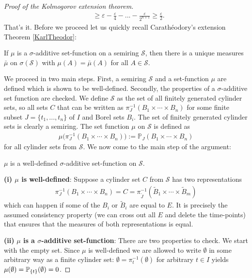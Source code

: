 \begin{proof}[Proof of the Kolmogorov extension theorem]
\begin{align*}
		&\geq \varepsilon-\frac{\varepsilon}{4}-...-\frac{\varepsilon}{2^{n+1}}
		\geq \frac{\varepsilon}{2}.
	\end{align*}
That's it. Before we proceed let us quickly recall Carath\'eodory's extension Theorem \ref{KarlTheodor}:	
	\begin{ltipp}
	If $\mu$ is a $\sigma$-additive set-function on a semiring $\mathcal S$, then there is a unique measures $\bar \mu$ on $\sigma(\mathcal S)$ with $\mu(A)=\bar \mu(A)$ for all $A\in \mathcal S$.
	\end{ltipp}
	We proceed in two main steps. First, a semiring $\mathcal S$ and a set-function $\mu$ are defined which is shown to be well-defined. Secondly, the properties of a $\sigma$-additive set function are checked. We define $\mathcal S$ as the set of all finitely generated cylinder sets, so all sets $C$ that can be written as $\pi^{-1}_J(B_1\times \cdots\times B_n)$ for some finite subset $J=\{t_1,...,t_n\}$ of $I$ and Borel sets $B_i$. The set of finitely generated cylinder sets is clearly a semiring. The set function $\mu$ on $\mathcal S$ is defined as 
	\begin{align}\label{eq_22}
		\mu\big(  \pi^{-1}_J(B_1\times \cdots\times B_n)  \big):=\mathbb{P}_{J}(B_1\times\cdots\times B_n)
	\end{align}
	for all cylinder sets from $\mathcal S$. We now come to the main step of the argument:
	\begin{lstep}
		$\mu$ is a well-defined $\sigma$-additive set-function on $\mathcal S$.
	\end{lstep}
	\textbf{(i) $\mu$ is well-defined}: Suppose a cylinder set $C$ from $\mathcal S$ has two representations 
	 \begin{align}\label{eq_27}
			\pi^{-1}_{J}(B_1\times \cdots \times B_n)=C=\pi^{-1}_{\tilde J}(\tilde B_1\times \cdots \times \tilde B_m)
	\end{align}
	which can happen if some of the $B_i$ or $\tilde B_i$ are equal to $E$. It is precisely the assumed consistency property (we can cross out all $E$ and delete the time-points) that ensures that the measures of both representations is equal.\smallskip

	\textbf{(ii)} \textbf{$\mu$ is a $\sigma$-additive set-function}: There are two properties to check. We start with the empty set.  Since $\mu$ is well-defined we are allowed to write $\emptyset$ in some arbitrary way as a finite cylinder set: $\emptyset = \pi^{-1}_t(\emptyset)$ for arbitrary $t\in I$ yields $\mu(\emptyset)=\P_{\{t\}}(\emptyset)=0$.


\end{proof}
